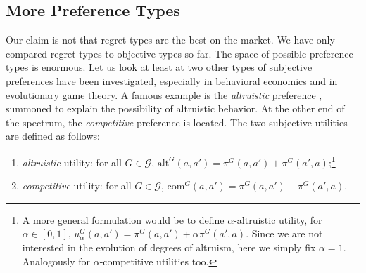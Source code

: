 \documentclass[fleqn,reqno,12pt]{article}
\theoremstyle{Satz}
\theoremstyle{Bsp}
\begin{document}
\subsection{More Preference Types}
\label{sec:more-types}

Our claim is not that regret types are the best on the market. We have only compared regret
types to objective types so far. The space of possible preference types is enormous. Let us
look at least at two other types of subjective preferences have been investigated, especially
in behavioral economics and in evolutionary game theory. A famous example is the
\textit{altruistic} preference \citep[e.g.,][]{Beck76,BestGuth98}, summoned to explain the
possibility of altruistic behavior. At the other end of the spectrum, the \emph{competitive}
preference is located. The two subjective utilities are defined as follows:
\begin{enumerate}
\item \textit{altruistic} utility: for all $G \in \mathcal{G}$, $\text{alt}^G(a,a') = \pi^G(a,a') + \pi^G(a',a)$;\footnote{A
    more general formulation would be to define $ \alpha$-altruistic utility, for
    $\alpha \in [0,1]$,
    $ u^G_\alpha(a, a')=\pi^G(a,a') + \alpha \pi^G(a',a)$. Since we are not
    interested in the evolution of degrees of altruism, here we simply fix $ \alpha = 1 $. Analogously for $\alpha$-competitive utilities too.}
\item \textit{competitive} utility: for all $G \in \mathcal{G}$, $\text{com}^G(a,a') = \pi^G(a,a') - \pi^G(a',a)$.
\end{enumerate}
\end{document}
